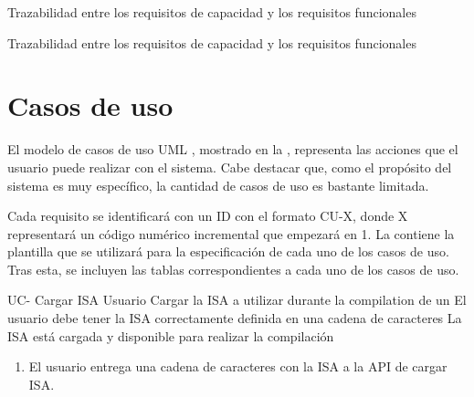     {Trazabilidad entre los requisitos de capacidad y los requisitos funcionales}

    {Trazabilidad entre los requisitos de capacidad y los requisitos funcionales}

\FloatBarrier

\section{Casos de uso}\label{sec:usecases}

El modelo de casos de uso UML \parencite{UMLSpec}, mostrado en la
, representa las acciones que el usuario puede realizar con
el sistema. Cabe destacar que, como el propósito del sistema es muy específico,
la cantidad de casos de uso es bastante limitada.


Cada requisito se identificará con un ID con el formato CU-X, donde X
representará un código numérico incremental que empezará en 1. La
 contiene la plantilla que se utilizará para la
especificación de cada uno de los casos de uso. Tras esta, se incluyen las tablas
correspondientes a cada uno de los casos de uso.


\setcounter{i}{1}


\begin{useCase}{UC-}
    {Cargar \gls{ISA}} %
    {Usuario} %
    {Cargar la \gls{ISA} a utilizar durante la \gls{compilation} de un } %
    {El usuario debe tener la \gls{ISA} correctamente definida en una cadena de caracteres} %
    {La \gls{ISA} está cargada y disponible para realizar la compilación} %
    \begin{enumerate}[leftmargin=*, topsep=0pt, noitemsep]
        \item El usuario entrega una cadena de caracteres con la
        \gls{ISA} a la \gls{API} de cargar \gls{ISA}.
    \end{enumerate}
\end{useCase}

